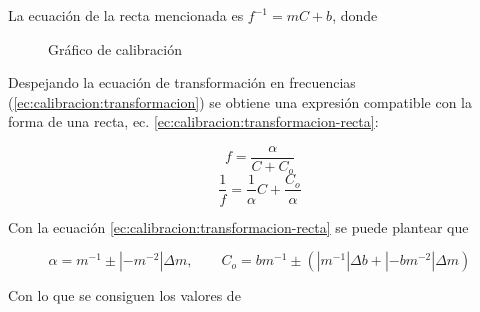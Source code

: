 La ecuación de la recta mencionada es $f^{-1} = mC + b$,
donde 

\begin{figure}[H]
    \centering
    
    \caption{Gráfico de calibración}
    \label{fig:calibracion:rectas}
\end{figure}

Despejando la ecuación de transformación en frecuencias
(\ref{ec:calibracion:transformacion}) se obtiene una expresión compatible con
la forma de una recta, ec. \ref{ec:calibracion:transformacion-recta}:

\vspace{10mm}
\begin{equation}
    \label{ec:calibracion:transformacion}
    f = \frac{\alpha}{C + C_o}
\end{equation}
\vspace{10mm}
\begin{equation}
    \label{ec:calibracion:transformacion-recta}
    \frac{1}{f} = \frac{1}{\alpha} C + \frac{C_o}{\alpha}
\end{equation}
\vspace{10mm}

Con la ecuación \ref{ec:calibracion:transformacion-recta} se puede plantear que

\vspace{5mm}
\[
    \alpha = m^{-1} \pm \left| -m^{-2} \right| \Delta m,
    \quad\quad
    C_o = bm^{-1} \pm \left( \left| m^{-1} \right| \Delta b +
        \left| -bm^{-2} \right| \Delta m \right)
\]
\vspace{5mm}

Con lo que se consiguen los valores de 
